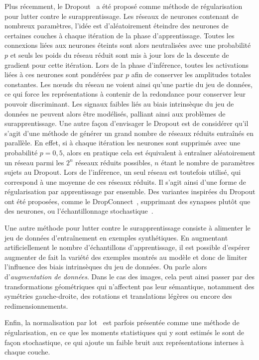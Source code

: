 Plus récemment, le Dropout~\cite{srivastava_dropout_2014} a été proposé comme méthode de régularisation pour lutter contre le surapprentissage. Les réseaux de neurones contenant de nombreux paramètres, l'idée est d'aléatoirement éteindre des neurones de certaines couches à chaque itération de la phase d'apprentissage. Toutes les connexions liées aux neurones éteints sont alors neutralisées avec une probabilité $p$ et seuls les poids du réseau réduit sont mis à jour lors de la descente de gradient pour cette itération. Lors de la phase d'inférence, toutes les activations liées à ces neurones sont pondérées par $p$ afin de conserver les amplitudes totales constantes. Les n\oe{}uds du réseau ne voient ainsi qu'une partie du jeu de données, ce qui force les représentations à contenir de la redondance pour conserver leur pouvoir discriminant. Les signaux faibles liés au biais intrinsèque du jeu de données ne peuvent alors être modélisés, palliant ainsi aux problèmes de surapprentissage. Une autre façon d'envisager le Dropout est de considérer qu'il s'agit d'une méthode de générer un grand nombre de réseaux réduits entraînés en parallèle. En effet, si à chaque itération les neurones sont supprimés avec une probabilité $p = 0,5$, alors en pratique cela est équivalent à entraîner aléatoirement un réseau parmi les $2^n$ réseaux réduits possibles, $n$ étant le nombre de paramètres sujets au Dropout. Lors de l'inférence, un seul réseau est toutefois utilisé, qui correspond à une moyenne de ces réseaux réduits. Il s'agit ainsi d'une forme de régularisation par apprentissage par ensemble. Des variantes inspirées du Dropout ont été proposées, comme le DropConnect~\cite{wan_regularization_2013}, supprimant des synapses plutôt que des neurones, ou l'échantillonnage stochastique~\cite{zeiler_stochastic_2013}.

Une autre méthode pour lutter contre le surapprentissage consiste à alimenter le jeu de données d'entraînement en exemples synthétiques. En augmentant artificiellement le nombre d'échantillons d'apprentissage, il est possible d'espérer augmenter de fait la variété des exemples montrés au modèle et donc de limiter l'influence des biais intrinsèques du jeu de données. On parle alors d'\emph{augmentation de données}. Dans le cas des images, cela peut ainsi passer par des transformations géométriques qui n'affectent pas leur sémantique, notamment des symétries gauche-droite, des rotations et translations légères ou encore des redimensionnements.

Enfin, la normalisation par lot~\cite{ioffe_batch_2015} est parfois présentée comme une méthode de régularisation, en ce que les moments statistiques qui y sont estimés le sont de façon stochastique, ce qui ajoute un faible bruit aux représentations internes à chaque couche.

